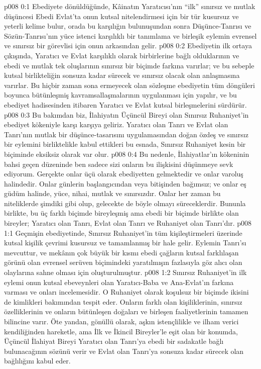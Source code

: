 \vs p008 0:1 Ebediyete dönüldüğünde, Kâinatın Yaratıcısı’nın “ilk” sınırsız ve mutlak düşüncesi Ebedi Evlat’ta onun kutsal nitelendirmesi için bir tür kusursuz ve yeterli kelime bulur, orada bu karşılığın bulunuşundan sonra Düşünce\hyp{}Tanrısı ve Sözün\hyp{}Tanrısı’nın yüce istenci karşılıklı bir tanımlama ve birleşik eylemin evrensel ve sınırsız bir görevlisi için onun arkasından gelir.
\vs p008 0:2 Ebediyetin ilk ortaya çıkışında, Yaratıcı ve Evlat karşılıklı olarak birbirlerine bağlı olduklarının ve ebedi ve mutlak tek oluşlarının sınırsız bir biçimde farkına varırlar; ve bu sebeple kutsal birlikteliğin sonsuza kadar sürecek ve sınırsız olacak olan anlaşmasına varırlar. Bu hiçbir zaman sona ermeyecek olan sözleşme ebediyetin tüm döngüleri boyunca bütünleşmiş kavramsallaşmalarının uygulanması için yapılır, ve bu ebediyet hadisesinden itibaren Yaratıcı ve Evlat kutsal birleşmelerini sürdürür.
\vs p008 0:3 Bu bakımdan biz, İlahiyatın Üçüncül Bireyi olan Sınırsız Ruhaniyet’in ebediyet kökeniyle karşı karşıya geliriz. Yaratıcı olan Tanrı ve Evlat olan Tanrı’nın mutlak bir düşünce\hyp{}tasarısını uygulamasından doğan özdeş ve sınırsız bir eylemini birliktelikle kabul ettikleri bu esnada, Sınırsız Ruhaniyet kesin bir biçiminde eksiksiz olarak var olur.
\vs p008 0:4 Bu nedenle, İlahiyatlar’ın kökeninin bahsi geçen düzeninde ben sadece sizi onların bu ilişkisini düşünmeye sevk ediyorum. Gerçekte onlar üçü olarak ebediyetten gelmektedir ve onlar varoluş halindedir. Onlar günlerin başlangıcından veya bitişinden bağımsız; ve onlar eş güdüm halinde, yüce, nihai, mutlak ve sınırsızdır. Onlar her zaman bu niteliklerde şimdiki gibi olup, gelecekte de böyle olmayı süreceklerdir. Bununla birlikte, bu üç farklı biçimde bireyleşmiş ama ebedi bir biçimde birlikte olan bireyler; Yaratıcı olan Tanrı, Evlat olan Tanrı ve Ruhaniyet olan Tanrı’dır.
\vs p008 1:1 Geçmişin ebediyetinde, Sınırsız Ruhaniyet’in tüm kişileştirmeleri üzerinde kutsal kişilik çevrimi kusursuz ve tamamlanmış bir hale gelir. Eylemin Tanrı’sı mevcuttur, ve mekânın çok büyük bir kısmı ebedi çağların kutsal farklılaşan görünü olan evrensel serüven biçimindeki yaratılmışın fazlasıyla göz alıcı olan olaylarına sahne olması için oluşturulmuştur.
\vs p008 1:2 Sınırsız Ruhaniyet’in ilk eylemi onun kutsal ebeveynleri olan Yaratıcı\hyp{}Baba ve Ana\hyp{}Evlat’ın farkına varması ve onları incelemesidir. O Ruhaniyet olarak koşulsuz bir biçimde ikisini de kimlikleri bakımından tespit eder. Onların farklı olan kişiliklerinin, sınırsız özelliklerinin ve onların bütünleşen doğaları ve birleşen faaliyetlerinin tamamen bilincine varır. Öte yandan, gönüllü olarak, aşkın istençlilikle ve ilham verici kendiliğinden hareketle, ama İlk ve İkincil Bireyler’le eşit olan bir konumda, Üçüncül İlahiyat Bireyi Yaratıcı olan Tanrı’ya ebedi bir sadakatle bağlı bulunacağının sözünü verir ve Evlat olan Tanrı’ya sonsuza kadar sürecek olan bağlılığını kabul eder.

